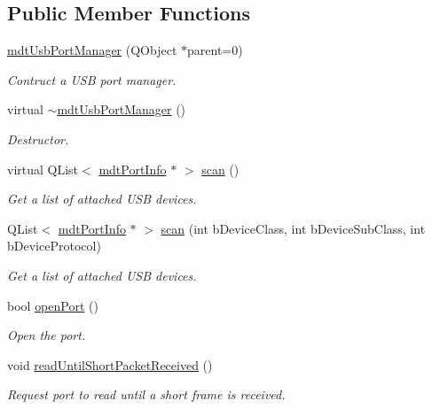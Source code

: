 \subsection*{Public Member Functions}
\begin{DoxyCompactItemize}
\item 
\hyperlink{classmdt_usb_port_manager_a7f82574e84d0a99d1c8bef7fd79283e3}{mdtUsbPortManager} (QObject $\ast$parent=0)
\begin{DoxyCompactList}\small\item\em Contruct a USB port manager. \end{DoxyCompactList}\item 
virtual \hyperlink{classmdt_usb_port_manager_ac0da1cf62e664b78fe91b873da5835ce}{$\sim$mdtUsbPortManager} ()
\begin{DoxyCompactList}\small\item\em Destructor. \end{DoxyCompactList}\item 
virtual QList$<$ \hyperlink{classmdt_port_info}{mdtPortInfo} $\ast$ $>$ \hyperlink{classmdt_usb_port_manager_a3a2370c3a2d0353a880bf9b777728c3b}{scan} ()
\begin{DoxyCompactList}\small\item\em Get a list of attached USB devices. \end{DoxyCompactList}\item 
QList$<$ \hyperlink{classmdt_port_info}{mdtPortInfo} $\ast$ $>$ \hyperlink{classmdt_usb_port_manager_ab28253c46c80bb12cbbd116b05c4bcd3}{scan} (int bDeviceClass, int bDeviceSubClass, int bDeviceProtocol)
\begin{DoxyCompactList}\small\item\em Get a list of attached USB devices. \end{DoxyCompactList}\item 
bool \hyperlink{classmdt_usb_port_manager_a7e7e6a29c2cf8d1d6bee23dd3f69d829}{openPort} ()
\begin{DoxyCompactList}\small\item\em Open the port. \end{DoxyCompactList}\item 
void \hyperlink{classmdt_usb_port_manager_adff8a1f8ed2b0e68229e2016c75e04a6}{readUntilShortPacketReceived} ()
\begin{DoxyCompactList}\small\item\em Request port to read until a short frame is received. \end{DoxyCompactList}\item 

\end{DoxyCompactItemize}
